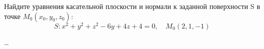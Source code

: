 \begin{problem}
Найдите уравнения касательной плоскости и нормали к заданной поверхности S в точке \( M_0(x_0, y_0, z_0) \):
\[ S\colon x^2 + y^2 + z^2 - 6y + 4z + 4=0, \quad M_0(2,1,-1) \]
\end{problem}

\begin{solution}
  \dots
\end{solution}